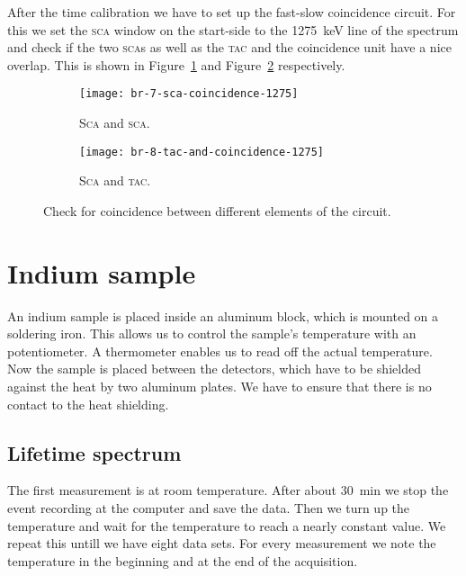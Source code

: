\documentclass[11pt, english, fleqn, DIV=15, headinclude, BCOR=2cm]{scrreprt}
\begin{document}
After the time calibration we have to set up the fast-slow coincidence
circuit. For this we set the \textsc{sca} window on the start-side
to the \SI{1275}{\kilo\electronvolt} line of the spectrum and check if the
two \textsc{sca}s as well as the \textsc{tac} and the coincidence unit have
a nice overlap. This is shown in Figure~\ref{fig:7-sca-coincidence-1275} and
Figure~\ref{fig:8-tac-and-coincidence-1275} respectively.

\begin{figure}
    \centering
    \begin{subfigure}[c]{0.48\linewidth}
        \centering
        \texttt{[image: br-7-sca-coincidence-1275]}
        \caption{%
                \textsc{Sca} and \textsc{sca}.
        }
        \label{fig:7-sca-coincidence-1275}
    \end{subfigure}
    \hfill
    \begin{subfigure}[c]{0.48\linewidth}
        \centering
        \texttt{[image: br-8-tac-and-coincidence-1275]}
        \caption{%
                \textsc{Sca} and \textsc{tac}.
        }
        \label{fig:8-tac-and-coincidence-1275}
    \end{subfigure}
    \caption{%
        Check for coincidence between different elements of the circuit.
    }
    \label{fig:}
\end{figure}

\section{Indium sample}

An indium sample is placed inside an aluminum block, which is mounted on a
soldering iron. This allows us to control the sample's temperature with an
potentiometer. A thermometer enables us to read off the actual temperature. Now
the sample is placed between the detectors, which have to be shielded against
the heat by two aluminum plates. We have to ensure that there is no contact to
the heat shielding. 

\subsection{Lifetime spectrum}

The first measurement is at room temperature. After about \SI{30}{\minute} we
stop the event recording at the computer and save the data. Then we turn up the
temperature and wait for the temperature to reach a nearly
constant value. We repeat this untill we have eight data sets. For every
measurement we note the temperature in the beginning and at the end of the
acquisition.
\end{document}
